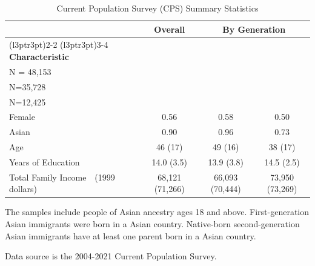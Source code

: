 \documentclass[12pt,english]{article}
\begin{document}
\begin{table}

\caption{Current Population Survey (CPS) Summary Statistics \label{tab:sumstat-adults}}
\centering
\begin{threeparttable}
\begin{tabular}[t]{lccc}
\toprule
\multicolumn{1}{c}{ } & \multicolumn{1}{c}{\textbf{Overall}} & \multicolumn{2}{c}{\textbf{By Generation}} \\
\cmidrule(l{3pt}r{3pt}){2-2} \cmidrule(l{3pt}r{3pt}){3-4}
\textbf{Characteristic} & \makecell[c]{\textbf{All Sample} \\N = 48,153} & \makecell[c]{\textbf{First} \\N=35,728} & \makecell[c]{\textbf{Second} \\N=12,425}\\
\midrule
Female & 0.56 & 0.58 & 0.50\\
Asian & 0.90 & 0.96 & 0.73\\
Age & 46 (17) & 49 (16) & 38 (17)\\
Years of Education & 14.0 (3.5) & 13.9 (3.8) & 14.5 (2.5)\\
Total Family Income\ \ 	 (1999 dollars) & 68,121 (71,266) & 66,093 (70,444) & 73,950 (73,269)\\
\bottomrule
\end{tabular}
\begin{tablenotes}
\item[1] The samples include people of Asian ancestry ages 18 and above. First-generation Asian immigrants were born in a Asian country. Native-born second-generation Asian immigrants have at least one parent born in a Asian country. 
\item[2] Data source is the 2004-2021 Current Population Survey.
\end{tablenotes}
\end{threeparttable}
\end{table}


\newpage
\pagebreak
\end{document}
